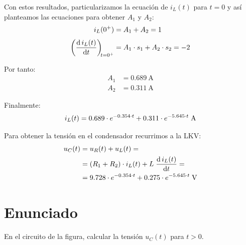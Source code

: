 \vspace{2mm}
Con estos resultados, particularizamos la ecuación de $i_L(t)$ para
$t = 0$ y así planteamos las ecuaciones para obtener $A_1$ y $A_2$:
\begin{align*}
  i_L(0^+) &= A_1 + A_2 = 1\\[3pt]
  \diff{\, i_L(t)}{t}[t = 0^+] &= A_1 \cdot s_1 + A_2 \cdot s_2 = -2
\end{align*}

Por tanto:
\begin{align*}
  A_1 &= \qty{0.689}{\ampere}\\
  A_2 &= \qty{0.311}{\ampere}
\end{align*}

Finalmente:
\begin{equation*}
  i_L(t) = 0.689 \cdot e^{-0.354 \cdot t} + 0.311 \cdot e^{-5.645 \cdot t}\;\si{\ampere}\\
\end{equation*}

\vspace{3mm}
Para obtener la tensión en el condensador recurrimos a la LKV:
\begin{align*}
  u_C(t) &= u_R(t) + u_L(t) = \\
         &= (R_1 + R_2) \cdot i_L(t) + L \; \diff{\, i_L(t)}{t} = \\
         &= 9.728 \cdot e^{-0.354 \cdot t} + 0.275 \cdot e^{-5.645 \cdot t} \;\si{\volt}
\end{align*}

\section{Enunciado}
En el circuito de la figura, calcular la tensión $u_C(t)$ para $t > 0$.

